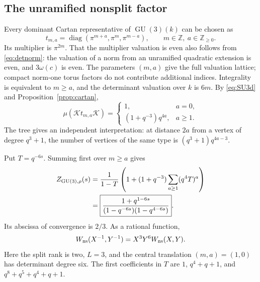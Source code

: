 \documentclass[11pt,a4paper]{article}
\theoremstyle{definition}
\newcommand{\Z}{\mathbb Z}
\newcommand{\GU}{\operatorname{GU}}
\begin{document}
\subsection{The unramified nonsplit factor}
Every dominant Cartan representative of $\GU(3)(k)$ can be chosen as
\[
 t_{m,a}=\operatorname{diag}(\pi^{m+a},\pi^m,\pi^{m-a}),
       \qquad m\in\Z,\ a\in\Z_{\geq0}.
\]
Its multiplier is $\pi^{2m}$. That the multiplier valuation is even
also follows from \eqref{eq:detnorm}: the valuation of a norm from an
unramified quadratic extension is even, and $3\omega(c)$ is even.
The parameters $(m,a)$ give the full valuation lattice; compact norm-one
torus factors do not contribute additional indices.
Integrality is equivalent to $m\geq a$, and the determinant valuation
over $k$ is $6m$. By \eqref{eq:SU3d} and
Proposition~\ref{prop:cartan},
\begin{equation}\label{eq:SU3vol}
 \mu(\mathcal Kt_{m,a}\mathcal K)=
 \begin{cases}
 1,&a=0,\\
 (1+q^{-3})q^{4a},&a\geq1.
 \end{cases}
\end{equation}
The tree gives an independent interpretation: at distance $2a$ from a
vertex of degree $q^3+1$, the number of vertices of the same type is
$(q^3+1)q^{4a-3}$.

Put $T=q^{-6s}$. Summing first over $m\geq a$ gives
\begin{align}
 Z_{\GU(3),\rho}(s)
  &=\frac1{1-T}\left(1+(1+q^{-3})
                              \sum_{a\geq1}(q^4T)^a\right)\notag\\
  &=\boxed{\frac{1+q^{1-6s}}
               {(1-q^{-6s})(1-q^{4-6s})}}.             \label{eq:GU3inert}
\end{align}
Its abscissa of convergence is $2/3$. As a rational function,
\begin{equation}\label{eq:GU3FE}
 W_{\rm ns}(X^{-1},Y^{-1})=X^3Y^6W_{\rm ns}(X,Y).
\end{equation}
Here the split rank is two, $L=3$, and the central translation
$(m,a)=(1,0)$ has determinant degree six. The first coefficients in
$T$ are $1$, $q^4+q+1$, and $q^8+q^5+q^4+q+1$.
\end{document}
